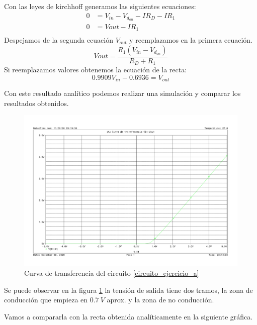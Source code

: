 {\begin{enumerate}[I)]
Con las leyes de kirchhoff generamos las siguientes ecuaciones:
\begin{equation}
\begin{split}
0&=V_{in}-V_{d_{on}}-IR_D-IR_1\\
0&=Vout-IR_1\\
\end{split}
\end{equation}
Despejamos de la segunda ecuación $V_{out}$ y reemplazamos en la primera
    ecuación.
    \begin{equation}
        Vout = \dfrac{R_1\left(V_{in}-V_{d_{on}}\right)}{R_D+R_1}
    \end{equation}
    Si reemplazamos valores obtenemos la ecuación de la recta:
    \begin{equation}
      0.9909V_{in}-0.6936 = V_{out}
    \end{equation}
  \end{enumerate}

Con este resultado analítico podemos realizar una simulación y
comparar los resultados obtenidos.

\begin{figure}[H]
\centering
\includegraphics[scale=0.5]{images/puntuable_3_transfer.pdf}
\caption{Curva de transferencia del circuito
  \ref{circuito_ejercicio_a}}
\label{transfer_function_a}
\end{figure}

Se puede observar en la figura \ref{transfer_function_a} la
tensión de salida tiene dos tramos, la zona de conducción que
empieza en $0.7 \ V$ aprox. y la zona de no conducción.

Vamos a compararla con la recta obtenida analíticamente en la
siguiente gráfica.

}

